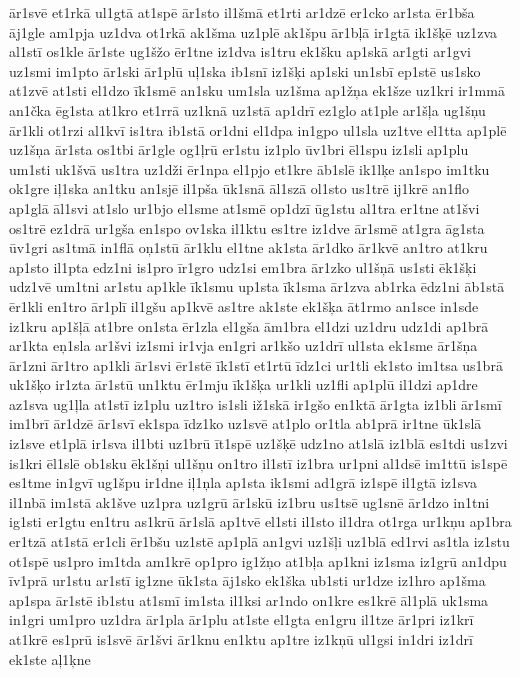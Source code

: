 {ār1svē
et1rkā
ul1gtā
at1spē
ār1sto
il1šmā
et1rti
ar1dzē
er1cko
ar1sta
ēr1bša
āj1gle
am1pja
uz1dva
ot1rkā
ak1šma
uz1plē
ak1špu
ār1bļā
ir1gtā
ik1šķē
uz1zva
al1stī
os1kle
ār1ste
ug1šžo
ēr1tne
iz1dva
is1tru
ek1šku
ap1skā
ar1gti
ar1gvi
uz1smi
im1pto
ār1ski
ār1plū
uļ1ska
ib1snī
iz1šķi
ap1ski
un1sbī
ep1stē
us1sko
at1zvē
at1sti
el1dzo
īk1smē
an1sku
um1sla
uz1šma
ap1žņa
ek1šze
uz1kri
ir1mmā
an1čka
ēg1sta
at1kro
et1rrā
uz1knā
uz1stā
ap1drī
ez1glo
at1ple
ar1šļa
ug1šņu
ār1kli
ot1rzi
al1kvī
is1tra
ib1stā
or1dni
el1dpa
in1gpo
ul1sla
uz1tve
el1tta
ap1plē
uz1šņa
ār1sta
os1tbi
ār1gle
og1ļrū
er1stu
iz1plo
ūv1bri
ēl1spu
iz1sli
ap1plu
um1sti
uk1švā
us1tra
uz1dži
ēr1npa
el1pjo
et1kre
āb1slē
ik1lķe
an1spo
im1tku
ok1gre
iļ1ska
an1tku
an1sjē
il1pša
ūk1snā
āl1szā
ol1sto
us1trē
ij1krē
an1flo
ap1glā
āl1svi
at1slo
ur1bjo
el1sme
at1smē
op1dzī
ūg1stu
al1tra
er1tne
at1švi
os1trē
ez1drā
ur1gša
en1spo
ov1ska
il1ktu
es1tre
iz1dve
ār1smē
at1gra
āg1sta
ūv1gri
as1tmā
in1flā
oņ1stū
ār1klu
el1tne
ak1sta
ār1dko
ār1kvē
an1tro
at1kru
ap1sto
il1pta
edz1ni
is1pro
īr1gro
udz1si
em1bra
ār1zko
ul1šņā
us1sti
ēk1šķi
udz1vē
um1tni
ar1stu
ap1kle
īk1smu
up1sta
īk1sma
ār1zva
ab1rka
ēdz1ni
āb1stā
ēr1kli
en1tro
ār1plī
il1gšu
ap1kvē
as1tre
ak1ste
ek1šķa
āt1rmo
an1sce
in1sde
iz1kru
ap1šļā
at1bre
on1sta
ēr1zla
el1gša
ām1bra
el1dzi
uz1dru
udz1di
ap1brā
ar1kta
eņ1sla
ar1švi
iz1smi
ir1vja
en1gri
ar1kšo
uz1drī
ul1sta
ek1sme
ār1šņa
ār1zni
ār1tro
ap1kli
ār1svi
ēr1stē
īk1stī
et1rtū
īdz1ci
ur1tli
ek1sto
im1tsa
us1brā
uk1šķo
ir1zta
ār1stū
un1ktu
ēr1mju
īk1šķa
ur1kli
uz1fli
ap1plū
il1dzi
ap1dre
az1sva
ug1ļla
at1stī
iz1plu
uz1tro
is1sli
iž1skā
ir1gšo
en1ktā
ār1gta
iz1bli
ār1smī
im1brī
ār1dzē
ār1svī
ek1spa
īdz1ko
uz1svē
at1plo
or1tla
ab1prā
ir1tne
ūk1slā
iz1sve
et1plā
ir1sva
il1bti
uz1brū
īt1spē
uz1šķē
udz1no
at1slā
iz1blā
es1tdi
us1zvi
is1kri
ēl1slē
ob1sku
ēk1šņi
ul1šņu
on1tro
il1stī
iz1bra
ur1pni
al1dsē
im1ttū
is1spē
es1tme
in1gvī
ug1špu
ir1dne
iļ1ņla
ap1sta
ik1smi
ad1grā
iz1spē
il1gtā
iz1sva
il1nbā
im1stā
ak1šve
uz1pra
uz1grū
ār1skū
iz1bru
us1tsē
ug1snē
ār1dzo
in1tni
ig1sti
er1gtu
en1tru
as1krū
ār1slā
ap1tvē
el1sti
il1sto
il1dra
ot1rga
ur1kņu
ap1bra
er1tzā
at1stā
er1cli
ēr1bšu
uz1stē
ap1plā
an1gvi
uz1šļi
uz1blā
ed1rvi
as1tla
iz1stu
ot1spē
us1pro
im1tda
am1krē
op1pro
ig1žņo
at1bļa
ap1kni
iz1sma
iz1grū
an1dpu
īv1prā
ur1stu
ar1stī
ig1zne
ūk1sta
āj1sko
ek1ška
ub1sti
ur1dze
iz1hro
ap1šma
ap1spa
ār1stē
ib1stu
at1smī
im1sta
il1ksi
ar1ndo
on1kre
es1krē
āl1plā
uk1sma
in1gri
um1pro
uz1dra
ār1pla
ār1plu
at1ste
el1gta
en1gru
il1tze
ār1pri
iz1krī
at1krē
es1prū
is1svē
ār1švi
ār1knu
en1ktu
ap1tre
iz1kņū
ul1gsi
in1dri
iz1drī
ek1ste
aļ1ķne
}
